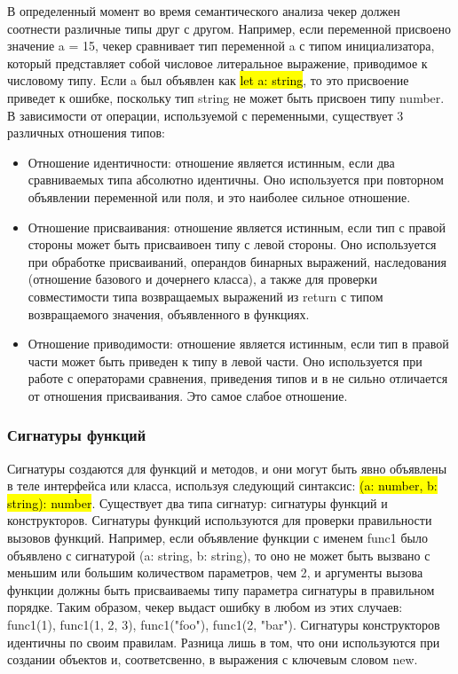 В определенный момент во время семантического анализа чекер должен соотнести различные типы друг с другом.
Например, если переменной присвоено значение a = 15, чекер сравнивает тип переменной a с типом
инициализатора, который представляет собой числовое литеральное выражение, приводимое к числовому типу.
Если a был объявлен как \hl{let a: string}, то это присвоение приведет к ошибке, поскольку тип string не может быть
присвоен типу number.
В зависимости от операции, используемой с переменными, существует 3 различных отношения типов:

\begin{itemize}[left=2em]
    \item Отношение идентичности: отношение является истинным, если два сравниваемых типа абсолютно идентичны.
    Оно используется при повторном объявлении переменной или поля, и это наиболее сильное отношение.
    \item Отношение присваивания: отношение является истинным, если тип с правой стороны может быть присваивоен типу
    с левой стороны.
    Оно используется при обработке присваиваний, операндов бинарных выражений, наследования (отношение базового и дочернего класса),
    а также для проверки совместимости типа возвращаемых выражений из return с типом возвращаемого значения, объявленного в функциях.
    \item Отношение приводимости: отношение является истинным, если тип в правой части может быть приведен к типу в левой части.
    Оно используется при работе с операторами сравнения, приведения типов и в не сильно отличается от отношения присваивания.
    Это самое слабое отношение.
\end{itemize}

\subsubsection{Сигнатуры функций}

Сигнатуры создаются для функций и методов, и они могут быть явно объявлены в теле интерфейса или класса,
используя следующий синтаксис: \hl{(a: number, b: string): number}.
Существует два типа сигнатур: сигнатуры функций и конструкторов.
Сигнатуры функций используются для проверки правильности вызовов функций.
Например, если объявление функции с именем func1 было объявлено с сигнатурой (a: string, b: string), то оно не может
быть вызвано с меньшим или большим количеством параметров, чем 2, и аргументы вызова функции должны быть присваиваемы
типу параметра сигнатуры в правильном порядке.
Таким образом, чекер выдаст ошибку в любом из этих случаев:
func1(1), func1(1, 2, 3), func1("foo"), func1(2, "bar").
Сигнатуры конструкторов идентичны по своим правилам.
Разница лишь в том, что они используются при создании объектов и, соответсвенно, в выражения с ключевым словом new.

